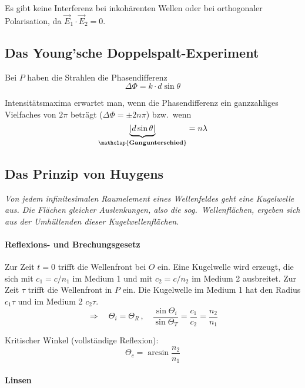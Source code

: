 		Es gibt keine Interferenz bei inkohärenten Wellen oder bei orthogonaler Polarisation, da $\vec E_1 \cdot \vec E_2 = 0$.
	\subsection{Das Young'sche Doppelspalt-Experiment} %
		\begin{center}
				
		\end{center}
		
		Bei $P$ haben die Strahlen die Phasendifferenz
		\[
			\Delta \Phi = k\cdot d \sin \theta
		\]
		
		Intensitätsmaxima erwartet man, wenn die Phasendifferenz ein ganzzahliges Vielfaches von $2\pi$ beträgt ($\Delta \Phi = \pm 2n\pi$) bzw.~wenn
		\[
			\underbrace{|d \sin \theta|}_{\mathclap{\text{\textbf{Gangunterschied}}}} = n\lambda
		\]
	\subsection{Das Prinzip von Huygens} %
		\emph{Von jedem infinitesimalen Raumelement eines Wellenfeldes geht eine Kugelwelle aus. Die Flächen gleicher Auslenkungen, also die sog.~Wellenflächen, ergeben sich aus der Umhüllenden dieser Kugelwellenflächen.}
		
		\paragraph{Reflexions- und Brechungsgesetz} %
			\begin{center}
				
			\end{center}
			
			Zur Zeit $t=0$ trifft die Wellenfront bei $O$ ein. Eine Kugelwelle wird erzeugt, die
			sich mit $c_1 = c/n_1$ im Medium 1 und mit $c_2 = c/n_2$ im Medium 2 ausbreitet.
			Zur Zeit $\tau$ trifft die Wellenfront in $P$ ein. Die Kugelwelle im Medium 1 hat den Radius $c_1 \tau$ und im Medium 2 $c_2 \tau$.
			\[
				\Rightarrow \quad \Theta_i = \Theta_R \,,\quad \frac{\sin\Theta_i}{\sin\Theta_T} = \frac{c_1}{c_2} = \frac{n_2}{n_1}
			\]
			
			Kritischer Winkel (vollständige Reflexion):
			\[
				\Theta_c = \arcsin \frac{n_2}{n_1}
			\]
		\paragraph{Linsen} %
			\begin{center}
				\vspace{-1cm}
				
			\end{center}
			
